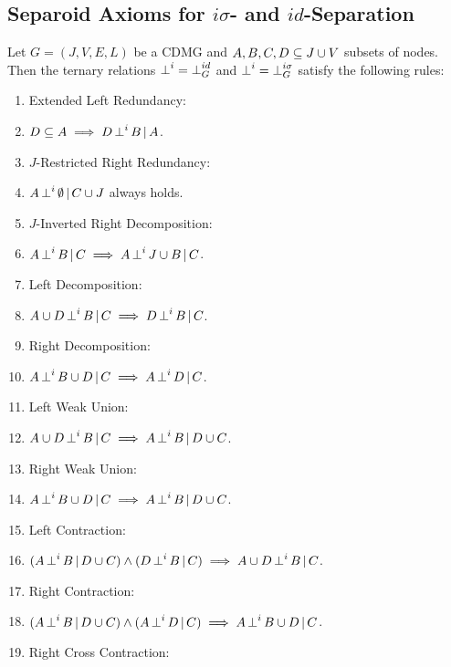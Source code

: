 \subsection{Separoid Axioms for $i\sigma$- and $id$-Separation}

\begin{defmark}
\begin{claimmark}
\begin{DefThm}
    \label{d-sep-separoid-axioms}
    Let $G=(J,V,E,L)$ be a CDMG and $A,B,C,D \subseteq J \cup V$ subsets of nodes.
Then the ternary relations $\operatorname*{\perp}^i = \operatorname*{\perp}^{id}_G$ and $\operatorname*{\perp}^i = \operatorname*{\perp}^{i\sigma}_G$ satisfy the following rules:
\begin{enumerate}[label=\alph*)]
    \item Extended Left Redundancy: 
    \item[] $D \subseteq A \implies D \operatorname*{\perp}^i  B \operatorname*{|} A$.
    \item $J$-Restricted Right Redundancy: 
    \item[] $A \operatorname*{\perp}^i  \emptyset \operatorname*{|} C \cup J$ always holds.
    \item $J$-Inverted Right Decomposition: 
    \item[] $A \operatorname*{\perp}^i  B \operatorname*{|} C \implies A \operatorname*{\perp}^i  J \cup B \operatorname*{|} C$.
	\item Left Decomposition:  
	\item[]$A \cup D \operatorname*{\perp}^i  B \operatorname*{|} C \implies D \operatorname*{\perp}^i  B \operatorname*{|} C$.
  \item Right Decomposition:  	
    \item[] $A \operatorname*{\perp}^i  B \cup D\operatorname*{|} C \implies A \operatorname*{\perp}^i  D \operatorname*{|} C$.
    \item Left Weak Union:
    \item[] $A \cup D \operatorname*{\perp}^i  B  \operatorname*{|} C \implies A \operatorname*{\perp}^i  B \operatorname*{|} D \cup C$.
  \item Right Weak Union:\item[] $A \operatorname*{\perp}^i  B \cup D \operatorname*{|} C \implies A \operatorname*{\perp}^i  B \operatorname*{|} D \cup C$.
\item Left Contraction:\item[] 
 $ (A \operatorname*{\perp}^i  B \operatorname*{|} D \cup C) \land (D \operatorname*{\perp}^i  B \operatorname*{|} C) \implies A \cup D \operatorname*{\perp}^i  B \operatorname*{|} C$.
\item Right Contraction:
\item[] $ (A \operatorname*{\perp}^i  B \operatorname*{|} D \cup C) \land (A \operatorname*{\perp}^i  D \operatorname*{|} C)  \implies A \operatorname*{\perp}^i  B \cup D \operatorname*{|} C$.
\item Right Cross Contraction:

\end{enumerate}
\end{DefThm}
\end{claimmark}
\end{defmark}

